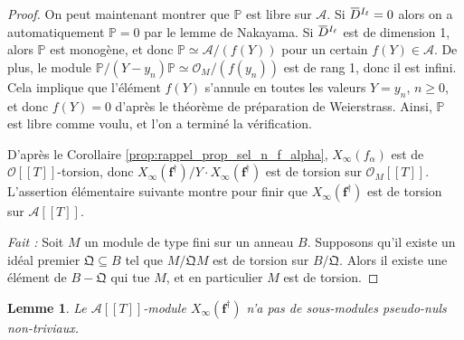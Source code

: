 \documentclass[12pt]{amsart}
\newcommand\bP{\mathbb{P}}
\newcommand\cA{\mathcal{A}}
\newcommand\cO{\mathcal{O}}
\newcommand\gQ{\mathfrak{Q}}
\newcommand{\ob}[1]{\mkern 1.5mu\overline{\mkern-1.5mu#1\mkern-1.5mu}\mkern 1.5mu}
\theoremstyle{defstyle}
\theoremstyle{thmstyle}
\newtheorem{lemme}[subsubsection]{Lemme}
\begin{document}
\begin{proof}
	On peut maintenant montrer que $\bP$ est libre sur $\cA$. Si $\ob{D}^{I_\ell}=0$ alors on a automatiquement $\bP=0$ par le lemme de Nakayama. Si $\ob{D}^{I_\ell}$ est de dimension 1, alors $\bP$ est monogène, et donc $\bP\simeq \cA/(f(Y))$ pour un certain $f(Y) \in \cA$. De plus, le module $\bP/ \left(Y-y_n\right) \bP \simeq \cO_M/(f(y_n))$ est de rang 1, donc il est infini. Cela implique que l'élément $f(Y)$ s'annule en toutes les valeurs $Y=y_n$, $n\geq 0$, et donc $f(Y)=0$ d'après le théorème de préparation de Weierstrass. Ainsi, $\bP$ est libre comme voulu, et l'on a terminé la vérification.
	
	D'après le Corollaire \ref{prop:rappel_prop_sel_n_f_alpha}, $X_\infty(f_\alpha)$ est de $\cO[[T]]$-torsion, donc $X_\infty(\textbf{f}^\dag)/Y\cdot X_\infty(\textbf{f}^\dag)$ est de torsion sur $\cO_M[[T]]$. L'assertion élémentaire suivante montre pour finir que $X_\infty(\textbf{f}^\dag)$ est de torsion sur $\cA[[T]]$.
	
	\textit{Fait :} Soit $M$ un module de type fini sur un anneau $B$. Supposons qu'il existe un idéal premier $\gQ \subseteq B$ tel que $M/\gQ M$ est de torsion sur $B/\gQ$. Alors il existe une élément de $B - \gQ$ qui tue $M$, et en particulier $M$ est de torsion. 
\end{proof}

\begin{lemme}\label{Och}
	Le $\cA[[T]]$-module $X_\infty(\textbf{f}^\dag)$ n'a pas de sous-modules pseudo-nuls non-triviaux.
\end{lemme}
\end{document}
